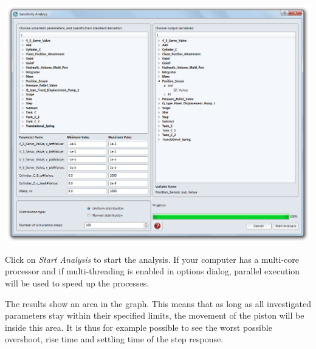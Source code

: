 \documentclass[a4paper,pdftex]{article}
\begin{document}
\begin{tutenumerate}
\includegraphics[width=\linewidth]{gfx/sensitivityanalysis/dialog.png}

Click on \textit{Start Analysis} to start the analysis. If your computer has a multi-core processor and if multi-threading is enabled in options dialog, parallel execution will be used to speed up the processes.

The results show an area in the graph. This means that as long as all investigated parameters stay within their specified limits, the movement of the piston will be inside this area. It is thus for example possible to see the worst possible overshoot, rise time and settling time of the step response.

\end{tutenumerate}
\end{document}

